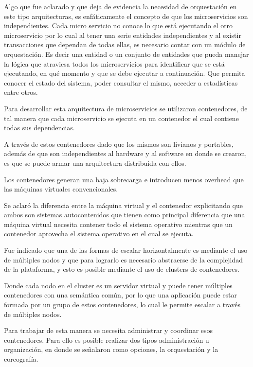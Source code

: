 Algo que fue aclarado y que deja de evidencia la necesidad de orquestación en este tipo arquitecturas, es enfáticamente el concepto de que los microservicios son independientes. 
Cada micro servicio no conoce lo que está ejecutando el otro microservicio por lo cual al tener una serie entidades independientes y al existir transacciones que dependan de todas ellas, es necesario contar con un módulo de orquestación. 
Es decir una entidad o un conjunto de entidades que pueda manejar la lógica que atraviesa todos los microservicios para identificar que se está ejecutando, en qué momento y que se debe ejecutar a continuación.
Que permita conocer el estado del sistema, poder consultar el mismo, acceder a estadísticas entre otros. 

Para desarrollar esta arquitectura de microservicios se utilizaron contenedores, de tal manera que cada microservicio se ejecuta en un contenedor el cual contiene todas sus dependencias.

A través de estos contenedores dado que los mismos son livianos y portables, además de que son independientes al hardware y al software en donde se crearon, es que se puede armar una arquitectura distribuida con ellos. 

Los contenedores generan una baja sobrecarga e introducen menos overhead que las máquinas virtuales convencionales. 

Se aclaró la diferencia entre la máquina virtual y el contenedor explicitando que ambos son sistemas autocontenidos que tienen como principal diferencia que una máquina virtual necesita contener todo el sistema operativo mientras que un contenedor aprovecha el sistema operativo en el cual se ejecuta. 

Fue indicado que una de las formas de escalar horizontalmente es mediante el uso de múltiples nodos y que para lograrlo es necesario abstraerse de la complejidad de la plataforma, y esto es posible mediante el uso de clusters de contenedores.

Donde cada nodo en el cluster es un servidor virtual y puede tener múltiples contenedores con una semántica común, por lo que una aplicación puede estar formada por un grupo de estos contenedores, lo cual le permite escalar a través de múltiples nodos. 

Para trabajar de esta manera se necesita administrar y coordinar esos contenedores. 
Para ello es posible realizar dos tipos administración u organización, en donde se señalaron como opciones, la orquestación y la coreografía. 

